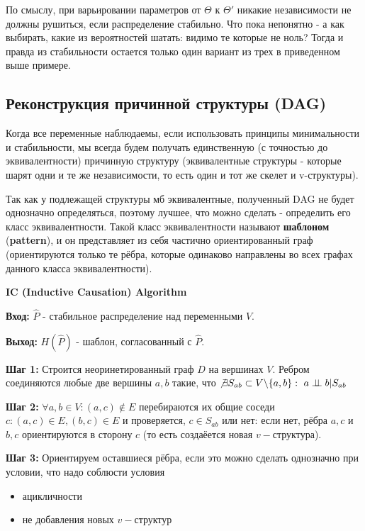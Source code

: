 \documentclass[fleqn]{article}
\newcommand{\independent}{\perp \!\!\! \perp}
\begin{document}
По смыслу, при варьировании параметров от $\Theta$ к $\Theta'$ никакие независимости не должны рушиться, если распределение стабильно. Что пока непонятно - а как выбирать, какие из вероятностей шатать: видимо те которые не ноль? Тогда и правда из стабильности остается только один вариант из трех в приведенном выше примере.

\subsection*{Реконструкция причинной структуры (DAG)}

Когда все переменные наблюдаемы, если использовать принципы минимальности и стабильности, мы всегда будем получать единственную (с точностью до эквивалентности) причинную структуру (эквивалентные структуры - которые шарят одни и те же независимости, то есть один и тот же скелет и v-структуры).

Так как у подлежащей структуры мб эквивалентные, полученный DAG не будет однозначно определяться, поэтому лучшее, что можно сделать - определить его класс эквивалентности. Такой класс эквивалентности называют \textbf{шаблоном} (\textbf{pattern}), и он представляет из себя частично ориентированный граф (ориентируются только те рёбра, которые одинаково направлены во всех графах данного класса эквивалентности).

\textbf{IC (Inductive Causation) Algorithm}

\textbf{Вход:} $\hat P$ - стабильное распределение над переменными $V$.

\textbf{Выход:} $H(\hat P)$ - шаблон, согласованный с $\hat P$.

\textbf{Шаг 1:} Строится неоринетированный граф $D$ на вершинах $V$. Ребром соединяются любые две вершины $a, b$ такие, что $\not\exists S_{ab} \subset V \backslash \{a,b\}:\ a \independent b | S_{ab}$ 

\textbf{Шаг 2:}  $\forall a, b \in V: (a,c) \not \in E$ перебираются их общие соседи $c: (a,c)\in E,  (b,c) \in E$ и проверяется, $c \in S_{ab}$ или нет: если нет, рёбра $a,c$ и $b,c$ ориентируются в сторону $c$ (то есть создаёется новая $v-$структура).

\textbf{Шаг 3:} Ориентируем оставшиеся рёбра, если это можно сделать однозначно при условии, что надо соблюсти условия \begin{itemize}
	\item ацикличности
	\item не добавления новых $v-$структур
\end{itemize}
\end{document}
